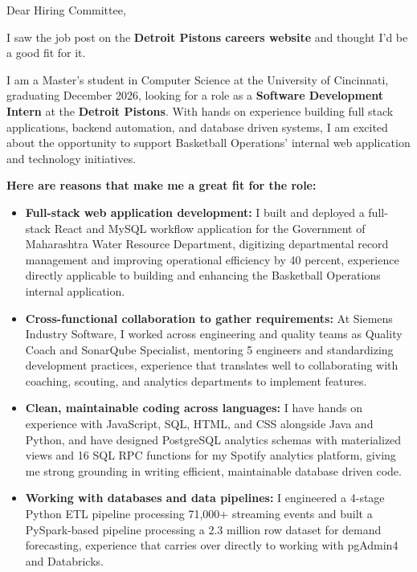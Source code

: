 \documentclass[11pt]{letter}
\date{}
\begin{document}
\begin{letter}{}

\opening{Dear Hiring Committee,}

I saw the job post on the \textbf{Detroit Pistons careers website} and thought I'd be a good fit for it.

I am a Master's student in Computer Science at the University of Cincinnati, graduating December 2026, looking for a role as a \textbf{Software Development Intern} at the \textbf{Detroit Pistons}. With hands on experience building full stack applications, backend automation, and database driven systems, I am excited about the opportunity to support Basketball Operations' internal web application and technology initiatives.

\textbf{Here are reasons that make me a great fit for the role:}

\begin{itemize}[leftmargin=*, itemsep=0.45em]
    \item \textbf{Full-stack web application development:} I built and deployed a full-stack React and MySQL workflow application for the Government of Maharashtra Water Resource Department, digitizing departmental record management and improving operational efficiency by 40 percent, experience directly applicable to building and enhancing the Basketball Operations internal application.

    \item \textbf{Cross-functional collaboration to gather requirements:} At Siemens Industry Software, I worked across engineering and quality teams as Quality Coach and SonarQube Specialist, mentoring 5 engineers and standardizing development practices, experience that translates well to collaborating with coaching, scouting, and analytics departments to implement features.

    \item \textbf{Clean, maintainable coding across languages:} I have hands on experience with JavaScript, SQL, HTML, and CSS alongside Java and Python, and have designed PostgreSQL analytics schemas with materialized views and 16 SQL RPC functions for my Spotify analytics platform, giving me strong grounding in writing efficient, maintainable database driven code.

    \item \textbf{Working with databases and data pipelines:} I engineered a 4-stage Python ETL pipeline processing 71,000+ streaming events and built a PySpark-based pipeline processing a 2.3 million row dataset for demand forecasting, experience that carries over directly to working with pgAdmin4 and Databricks.


\end{itemize}
\end{letter}
\end{document}
